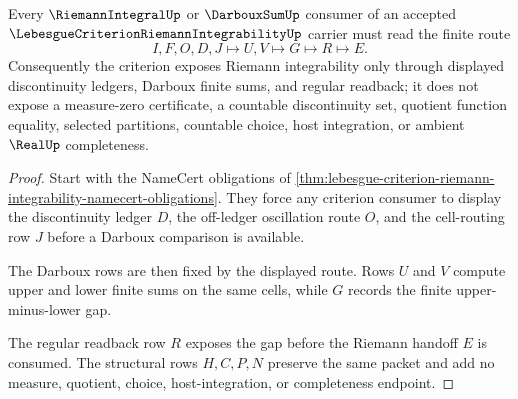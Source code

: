 \begin{theorem}
\label{thm:lebesgue-criterion-riemann-integrability-darboux-discontinuity-route}
Every $\RiemannIntegralUp$ or $\DarbouxSumUp$ consumer of an accepted $\LebesgueCriterionRiemannIntegrabilityUp$ carrier must read the finite route
$$
I,F,O,D,J \longmapsto U,V \longmapsto G \longmapsto R \longmapsto E .
$$
Consequently the criterion exposes Riemann integrability only through displayed discontinuity ledgers, Darboux finite sums, and regular readback; it does not expose a measure-zero certificate, a countable discontinuity set, quotient function equality, selected partitions, countable choice, host integration, or ambient $\RealUp$ completeness.
\end{theorem}
\begin{proof}
Start with the NameCert obligations of \autoref{thm:lebesgue-criterion-riemann-integrability-namecert-obligations}. They force any criterion consumer to display the discontinuity ledger $D$, the off-ledger oscillation route $O$, and the cell-routing row $J$ before a Darboux comparison is available.

The Darboux rows are then fixed by the displayed route. Rows $U$ and $V$ compute upper and lower finite sums on the same cells, while $G$ records the finite upper-minus-lower gap.

The regular readback row $R$ exposes the gap before the Riemann handoff $E$ is consumed. The structural rows $H,C,P,N$ preserve the same packet and add no measure, quotient, choice, host-integration, or completeness endpoint.
\end{proof}



